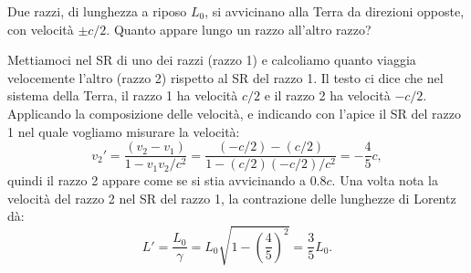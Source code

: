 \begin{Exercise}[title={Composizione relativistica delle velocit\`a e contrazione delle lunghezze}]
  Due razzi, di lunghezza a riposo $L_0$, si avvicinano alla Terra da direzioni opposte, con velocit\`a $\pm c/2$. Quanto appare lungo un razzo all'altro razzo?
\end{Exercise}
\begin{Answer}
  Mettiamoci nel SR di uno dei razzi (razzo 1) e calcoliamo quanto
  viaggia velocemente l'altro (razzo 2) rispetto al SR del razzo 1.
  Il testo ci dice che nel sistema della Terra, il razzo 1 ha
  velocit\`a $c/2$ e il razzo 2 ha velocit\`a $-c/2$. Applicando la
  composizione delle velocit\`a, e indicando con l'apice il SR del razzo 1 nel quale vogliamo misurare la velocit\`a:
  \begin{equation*}
    v_2' = \frac{(v_2-v_1)}{1-v_1v_2/c^2} = \frac{(-c/2)-(c/2)}{1-(c/2)(-c/2)/c^2} = -\frac{4}{5}c,
  \end{equation*}
  quindi il razzo 2 appare come se si stia avvicinando a $0.8c$. Una volta nota la velocit\`a del razzo 2 nel SR del razzo 1, la
  contrazione delle lunghezze di Lorentz d\`a:
  \begin{equation*}
    L' = \frac{L_0}{\gamma} = L_0\sqrt{1-\left(\frac{4}{5}\right)^2} = \frac{3}{5}L_0.
  \end{equation*}
\end{Answer}

